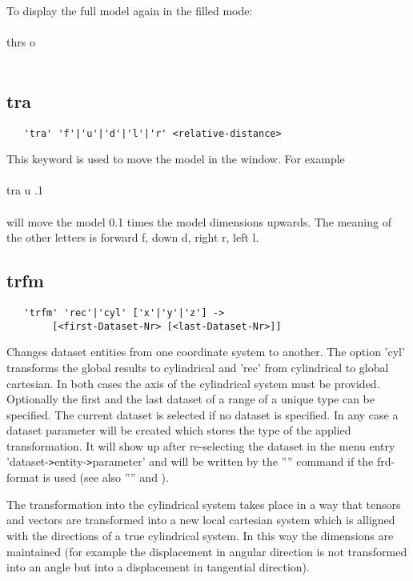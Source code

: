 \documentclass{article}
\begin{document}
To display the full model again in the filled mode:\\\\thrs o\\\\

\subsection{\label{tra}tra}
\begin{verbatim}
   'tra' 'f'|'u'|'d'|'l'|'r' <relative-distance>
\end{verbatim}
This keyword is used to move the model in the window. For example\\\\tra u .1\\\\will move the model 0.1 times the model dimensions upwards. The meaning of the other letters is forward f, down d, right r, left l. 

\subsection{\label{trfm}trfm}
\begin{verbatim}
   'trfm' 'rec'|'cyl' ['x'|'y'|'z'] ->
        [<first-Dataset-Nr> [<last-Dataset-Nr>]]
\end{verbatim}
Changes dataset entities from one coordinate system to another. The option
'cyl' transforms the global results to cylindrical and 'rec' from cylindrical
to global cartesian. In both cases the axis of the cylindrical system must be
provided. Optionally the first and the last dataset of a range of a unique
type can be specified. The current dataset is selected if no dataset is
specified. In any case a dataset parameter will be created which stores the type of the applied transformation. It will show up after re-selecting the dataset in the menu entry 'dataset-\verb_>_entity-\verb_>_parameter' and will be written by the '''' command if the frd-format is used (see also '''' and ).

The transformation into the cylindrical system takes place in a way that tensors and vectors are transformed into a new local cartesian system which is alligned with the directions of a true cylindrical system. In this way the dimensions are maintained (for example the displacement in angular direction is not transformed into an angle but into a displacement in tangential direction).
\end{document}
